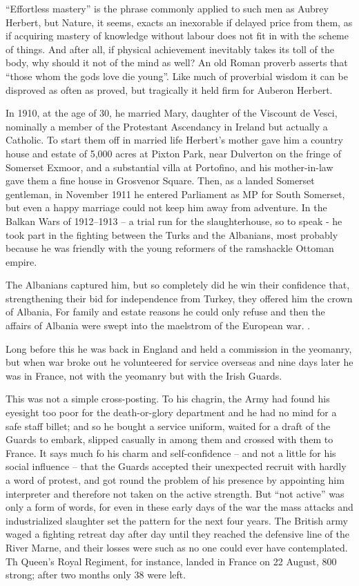 “Effortless mastery” is the phrase commonly applied to such men as Aubrey Herbert, but Nature, it seems, exacts an inexorable if delayed price from them, as if acquiring mastery of knowledge without labour does not fit in with the scheme of things. And after all, if physical achievement inevitably takes its toll of the body, why should it not of the mind as well? An old Roman proverb asserts that “those whom the gods love die young”. Like much of proverbial wisdom it can be disproved as often as proved, but tragically it held firm for Auberon Herbert. 
 

In 1910, at the age of 30, he married Mary, daughter of the Viscount de Vesci, nominally a member of the Protestant Ascendancy in Ireland but actually a Catholic. To start them off in married life Herbert’s mother gave him a country house and estate of 5,000 acres at Pixton Park, near Dulverton on the fringe of Somerset Exmoor, and a substantial villa at Portofino, and his mother-in-law gave them a fine house in Grosvenor Square. Then, as a landed Somerset gentleman, in November 1911 he entered Parliament as MP for South Somerset, but even a happy marriage could not keep him away from adventure. In the Balkan Wars of 1912–1913 – a trial run for the slaughterhouse, so to speak - he took part in the fighting between the Turks and the Albanians, most probably because he was friendly with the young reformers of the ramshackle Ottoman empire.

The Albanians captured him, but so completely did he win their confidence that, strengthening their bid for independence from Turkey, they offered him the crown of Albania, For family and estate reasons he could only refuse and then the affairs of Albania were swept into the maelstrom of the European war. .

Long before this he was back in England and held a commission in the yeomanry, but when war broke out he volunteered for service overseas and nine days later he was in France, not with the yeomanry but with the Irish Guards. 

This was not a simple cross-posting. To his chagrin, the Army had found his eyesight too poor for the death-or-glory department and he had no mind for a safe staff billet; and so he bought a service uniform, waited for a draft of the Guards to embark, slipped casually in among them and crossed with them to France. It says much fo his charm and self-confidence – and not a little for his social influence – that the Guards accepted their unexpected recruit with hardly a word of protest, and got round the problem of his presence by appointing him interpreter and therefore not taken on the active strength. But “not active” was only a form of words, for even in these early days of the war the mass attacks and industrialized slaughter set the pattern for the next four years. The British army waged a fighting retreat day after day until they reached the defensive line of the River Marne, and their losses were such as no one could ever have contemplated. Th Queen’s Royal Regiment, for instance, landed in France on 22 August, 800 strong; after two months only 38 were left. 

